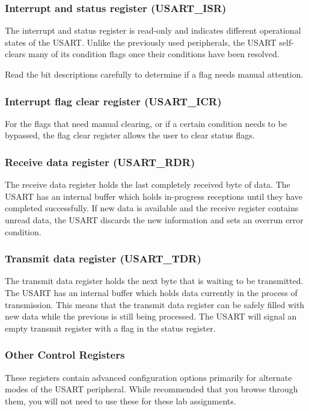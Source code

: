 \documentclass[openany,11pt,fleqn]{book} %
\begin{document}
\subsubsection{Interrupt and status register (USART\_ISR)}
The interrupt and status register is read-only and indicates different operational states of the USART. Unlike the previously used peripherals, the USART self-clears many of its condition flags once their conditions have been resolved. 

Read the bit descriptions carefully to determine if a flag needs manual attention.

\subsubsection{Interrupt flag clear register (USART\_ICR)}
For the flags that need manual clearing, or if a certain condition needs to be bypassed, the flag clear register allows the user to clear status flags. 

\subsubsection{Receive data register (USART\_RDR)}
The receive data register holds the last completely received byte of data. The USART has an internal buffer which holds in-progress receptions until they have completed successfully. If new data is available and the receive register contains unread data, the USART discards the new information and sets an overrun error condition.

\subsubsection{Transmit data register (USART\_TDR)}
The transmit data register holds the next byte that is waiting to be transmitted. The USART has an internal buffer which holds data currently in the process of transmission. This means that the transmit data register can be safely filled with new data while the previous is still being processed. The USART will signal an empty transmit register with a flag in the status register. 

\subsubsection{Other Control Registers}
These registers contain advanced configuration options primarily for alternate modes of the USART peripheral. While recommended that you browse through them, you will not need to use these for these lab assignments.
\end{document}
